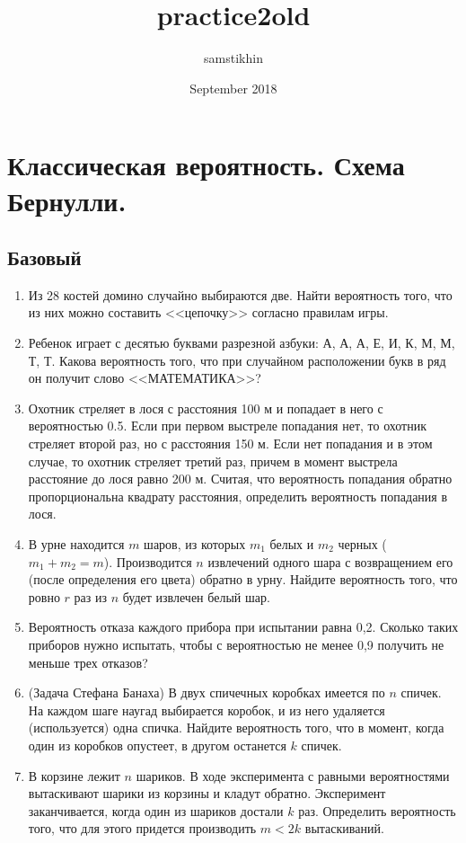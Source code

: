 \documentclass[a4paper, 14pt]{extarticle}
\title{practice2old}
\author{samstikhin }
\date{September 2018}
\begin{document}
\section*{Классическая вероятность. Схема Бернулли.}
\subsection*{Базовый}
\begin{enumerate}
\item  Из 28 костей домино случайно выбираются две.
Найти вероятность  того, что из них можно 
составить <<цепочку>> согласно правилам игры.
\item Ребенок играет с десятью буквами разрезной азбуки: А, А, А,
Е, И, К, М, М, Т, Т. Какова вероятность того, что при случайном
расположении букв в ряд он получит слово <<МАТЕМАТИКА>>?

\item Охотник стреляет в лося с расстояния 100 м и 
	попадает в него с вероятностью 0.5. Если при первом выстреле
	попадания нет, то охотник стреляет второй раз, но с 
	расстояния 150 м. Если нет попадания и в этом случае, то охотник
	стреляет третий раз, причем в момент выстрела расстояние до
	лося равно 200 м. Считая, что вероятность попадания 
	обратно пропорциональна квадрату расстояния, определить 
	вероятность попадания в лося.

\item В урне находится $m$ шаров, из которых $m_1$ белых и $m_2$ черных
($m_1 + m_2 = m$). Производится $n$ извлечений одного шара с возвращением его (после определения его цвета) обратно в урну. Найдите
вероятность того, что ровно $r$ раз из $n$ будет извлечен белый шар.
\item Вероятность отказа каждого прибора при испытании
	равна 0,2. Сколько таких приборов нужно испытать, чтобы с
	вероятностью не менее 0,9 получить не меньше трех отказов?

\item (Задача Стефана Банаха) В двух спичечных коробках
имеется по $n$ спичек. На каждом шаге наугад выбирается коробок, и из
него удаляется (используется) одна спичка. Найдите вероятность того,
что в момент, когда один из коробков опустеет, в другом останется $k$
спичек.

\item В корзине лежит $n$ шариков. В ходе эксперимента с равными вероятностями вытаскивают шарики из корзины и кладут обратно. Эксперимент заканчивается, когда один из шариков достали $k$ раз. Определить вероятность того, что для этого
придется производить $m<2k$ вытаскиваний.

\end{enumerate}
\end{document}

